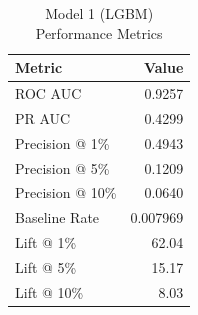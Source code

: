 \begin{table}[h]
\centering
\begin{tabular}{lr}
\toprule
Metric & Value \\
\midrule
ROC AUC & 0.9257 \\
PR AUC & 0.4299 \\
Precision @ 1\% & 0.4943 \\
Precision @ 5\% & 0.1209 \\
Precision @ 10\% & 0.0640 \\
Baseline Rate & 0.007969 \\
Lift @ 1\% & 62.04 \\
Lift @ 5\% & 15.17 \\
Lift @ 10\% & 8.03 \\
\bottomrule
\end{tabular}
\caption{Model 1 (LGBM) Performance Metrics}
\label{tab:model1_lgbm_metrics}
\end{table}
